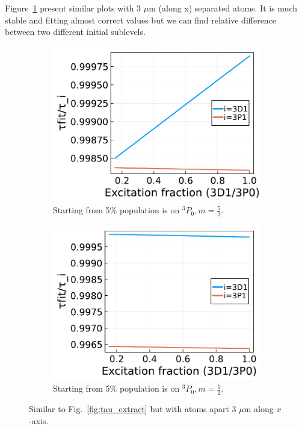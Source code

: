 \documentclass{article}
\begin{document}
Figure~\ref{fig:tau_extract_3um} present similar plots with 3 $\mu$m (along x) separated atoms. It is much stable and fitting almost correct values but we can find relative difference between two different initial sublevels. 
\begin{figure}
    \centering
    \begin{subfigure}[b]{.49\linewidth}
        \includegraphics[width=\linewidth]{tauratio_m=2.5_S=0.95_r12=3.pdf}
        \caption{Starting from 5\% population is on $^3P_0, m=\frac{5}{2}$.}
    \end{subfigure}
    \begin{subfigure}[b]{.49\linewidth}
        \includegraphics[width=\linewidth]{tauratio_m=0.5_S=0.95_r12=3.pdf}
        \caption{Starting from 5\% population is on $^3P_0, m=\frac{1}{2}$. }
    \end{subfigure} 
    \caption{Similar to Fig.~\ref{fig:tau_extract} but with atoms apart 3 $\mu$m along $x$-axis. \label{fig:tau_extract_3um}}
\end{figure}
\end{document}

